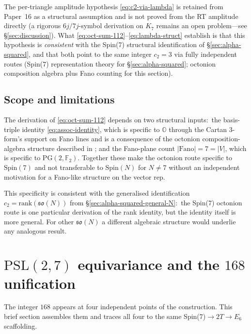 \documentclass[11pt]{article}
\newcommand{\so}{\mathfrak{so}}
\newcommand{\Spin}{\mathrm{Spin}}
\begin{document}
The per-triangle amplitude hypothesis \eqref{eq:c2-via-lambda}
is retained from Paper~16 as a structural assumption and is not
proved from the RT amplitude directly (a rigorous
$6j/7j$-symbol derivation on $K_7$ remains an open
problem---see \S\ref{sec:discussion}).  What
\eqref{eq:oct-sum-112}--\eqref{eq:lambda-struct} establish is that
this hypothesis is \emph{consistent} with the Spin(7) structural
identification of \S\ref{sec:alpha-squared}, and that both point
to the same integer $c_2 = 3$ via fully independent routes (Spin(7)
representation theory for \S\ref{sec:alpha-squared}; octonion
composition algebra plus Fano counting for this section).

\subsection{Scope and limitations}
\label{sec:oct-scope}

The derivation of \eqref{eq:oct-sum-112} depends on two
structural inputs:\ the basis-triple identity
\eqref{eq:assoc-identity}, which is specific to $\mathbb{O}$
through the Cartan 3-form's support on Fano lines and is a
consequence of the octonion composition-algebra structure
described in \cite[\S4.1]{baez-octonions}; and the Fano-plane
count $|\mathrm{Fano}| = 7 = |V|$, which is specific to
$\mathrm{PG}(2, \mathbb{F}_2)$.  Together these make the octonion
route specific to $\Spin(7)$ and not transferable to $\Spin(N)$
for $N \neq 7$ without an independent motivation for a Fano-like
structure on the vector rep.

This specificity is consistent with the generalised identification
$c_2 = \mathrm{rank}(\so(N))$ from
\S\ref{sec:alpha-squared-general-N}:\ the Spin(7) octonion route
is one particular derivation of the rank identity, but the
identity itself is more general.  For other $\so(N)$ a different
algebraic structure would underlie any analogous result.

\section{$\mathrm{PSL}(2,7)$ equivariance and the $168$ unification}
\label{sec:psl27}

The integer $168$ appears at four independent points of the
construction.  This brief section assembles them and traces all
four to the same Spin(7)$\to 2T \to E_6$ scaffolding.
\end{document}
